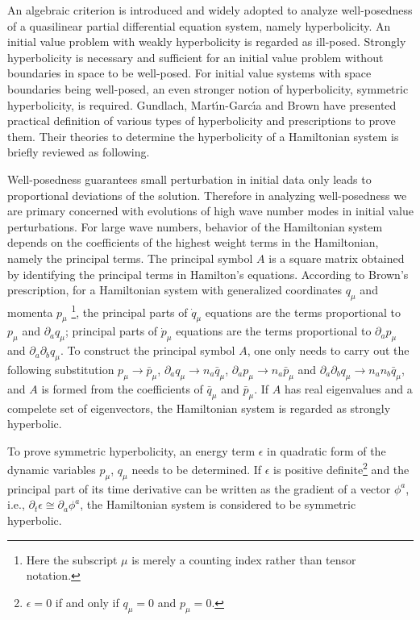 An algebraic criterion is introduced and widely adopted to analyze well-posedness of a quasilinear partial differential equation system, namely hyperbolicity. An initial value problem with weakly hyperbolicity is regarded as ill-posed. Strongly hyperbolicity is necessary and sufficient for an initial value problem without boundaries in space to be well-posed. For initial value systems with space boundaries being well-posed, an even stronger notion of hyperbolicity, symmetric hyperbolicity, is required. Gundlach, Mart\' \i n-Garc\' \i a\cite{Gundlach:2005ta} and Brown\cite{Brown:2008cca} have presented practical definition of various types of hyperbolicity and prescriptions to prove them. Their theories to determine the hyperbolicity of a Hamiltonian system is briefly reviewed as following. 

Well-posedness guarantees small perturbation in initial data only leads to proportional deviations of the solution. Therefore in analyzing well-posedness we are primary concerned with evolutions of high wave number modes in initial value perturbations. For large wave numbers, behavior of the Hamiltonian system depends on the coefficients of the highest weight terms in the Hamiltonian, namely the principal terms. The principal symbol $A$ is a square matrix obtained by identifying the principal terms in Hamilton's equations. According to Brown's prescription\cite{Brown:2008cca}, for a Hamiltonian system with generalized coordinates $q_{\mu}$ and momenta $p_{\mu}$ \footnote{Here the subscript $\mu$ is merely a counting index rather than tensor notation.}, the principal parts of ${\dot q}_{\mu}$ equations are the terms proportional to $p_{\mu}$ and $\partial_{a}q_{\mu}$; principal parts of ${\dot p}_{\mu}$ equations are the terms proportional to $\partial_{a}p_{\mu}$ and $\partial_{a}\partial_{b}q_{\mu}$. To construct the principal symbol $A$, one only needs to carry out the following substitution $p_{\mu} \rightarrow {\bar p}_{\mu}$, $\partial_{a}q_{\mu} \rightarrow n_{a}{\bar q}_{\mu}$, $\partial_{a}p_{\mu} \rightarrow n_{a}{\bar p}_{\mu}$ and $\partial_{a}\partial_{b}q_{\mu} \rightarrow n_{a}n_{b}{\bar q}_{\mu}$, and $A$ is formed from the coefficients of ${\bar q}_{\mu}$ and ${\bar p}_{\mu}$. If $A$ has real eigenvalues and a compelete set of eigenvectors, the Hamiltonian system is regarded as strongly hyperbolic. 

To prove symmetric hyperbolicity, an energy term $\epsilon$ in quadratic form of the dynamic variables $p_{\mu}$, $q_{\mu}$ needs to be determined. If $\epsilon$ is positive definite\footnote{$\epsilon = 0$ if and only if $q_{\mu} = 0$ and $p_{\mu} = 0$.} and the principal part of its time derivative can be written as the gradient of a vector $\phi^{a}$, i.e., $\partial_{t}\epsilon \cong \partial_{a}\phi^{a}$, the Hamiltonian system is considered to be symmetric hyperbolic. 

